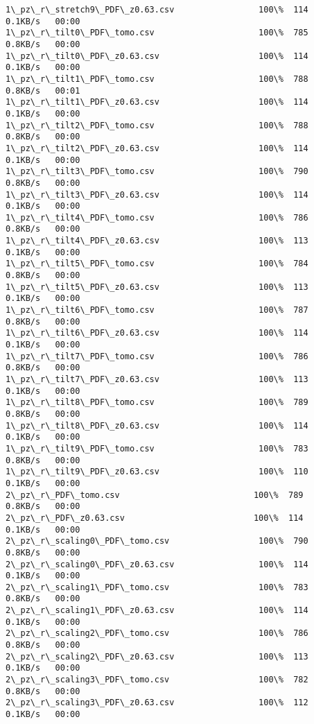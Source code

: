\documentclass[11pt]{article}
\begin{document}
\begin{Verbatim}[commandchars=\\\{\}]
1\_pz\_r\_stretch9\_PDF\_z0.63.csv                 100\%  114     0.1KB/s   00:00    
1\_pz\_r\_tilt0\_PDF\_tomo.csv                     100\%  785     0.8KB/s   00:00    
1\_pz\_r\_tilt0\_PDF\_z0.63.csv                    100\%  114     0.1KB/s   00:00    
1\_pz\_r\_tilt1\_PDF\_tomo.csv                     100\%  788     0.8KB/s   00:01    
1\_pz\_r\_tilt1\_PDF\_z0.63.csv                    100\%  114     0.1KB/s   00:00    
1\_pz\_r\_tilt2\_PDF\_tomo.csv                     100\%  788     0.8KB/s   00:00    
1\_pz\_r\_tilt2\_PDF\_z0.63.csv                    100\%  114     0.1KB/s   00:00    
1\_pz\_r\_tilt3\_PDF\_tomo.csv                     100\%  790     0.8KB/s   00:00    
1\_pz\_r\_tilt3\_PDF\_z0.63.csv                    100\%  114     0.1KB/s   00:00    
1\_pz\_r\_tilt4\_PDF\_tomo.csv                     100\%  786     0.8KB/s   00:00    
1\_pz\_r\_tilt4\_PDF\_z0.63.csv                    100\%  113     0.1KB/s   00:00    
1\_pz\_r\_tilt5\_PDF\_tomo.csv                     100\%  784     0.8KB/s   00:00    
1\_pz\_r\_tilt5\_PDF\_z0.63.csv                    100\%  113     0.1KB/s   00:00    
1\_pz\_r\_tilt6\_PDF\_tomo.csv                     100\%  787     0.8KB/s   00:00    
1\_pz\_r\_tilt6\_PDF\_z0.63.csv                    100\%  114     0.1KB/s   00:00    
1\_pz\_r\_tilt7\_PDF\_tomo.csv                     100\%  786     0.8KB/s   00:00    
1\_pz\_r\_tilt7\_PDF\_z0.63.csv                    100\%  113     0.1KB/s   00:00    
1\_pz\_r\_tilt8\_PDF\_tomo.csv                     100\%  789     0.8KB/s   00:00    
1\_pz\_r\_tilt8\_PDF\_z0.63.csv                    100\%  114     0.1KB/s   00:00    
1\_pz\_r\_tilt9\_PDF\_tomo.csv                     100\%  783     0.8KB/s   00:00    
1\_pz\_r\_tilt9\_PDF\_z0.63.csv                    100\%  110     0.1KB/s   00:00    
2\_pz\_r\_PDF\_tomo.csv                           100\%  789     0.8KB/s   00:00    
2\_pz\_r\_PDF\_z0.63.csv                          100\%  114     0.1KB/s   00:00    
2\_pz\_r\_scaling0\_PDF\_tomo.csv                  100\%  790     0.8KB/s   00:00    
2\_pz\_r\_scaling0\_PDF\_z0.63.csv                 100\%  114     0.1KB/s   00:00    
2\_pz\_r\_scaling1\_PDF\_tomo.csv                  100\%  783     0.8KB/s   00:00    
2\_pz\_r\_scaling1\_PDF\_z0.63.csv                 100\%  114     0.1KB/s   00:00    
2\_pz\_r\_scaling2\_PDF\_tomo.csv                  100\%  786     0.8KB/s   00:00    
2\_pz\_r\_scaling2\_PDF\_z0.63.csv                 100\%  113     0.1KB/s   00:00    
2\_pz\_r\_scaling3\_PDF\_tomo.csv                  100\%  782     0.8KB/s   00:00    
2\_pz\_r\_scaling3\_PDF\_z0.63.csv                 100\%  112     0.1KB/s   00:00    

\end{Verbatim}
\end{document}
